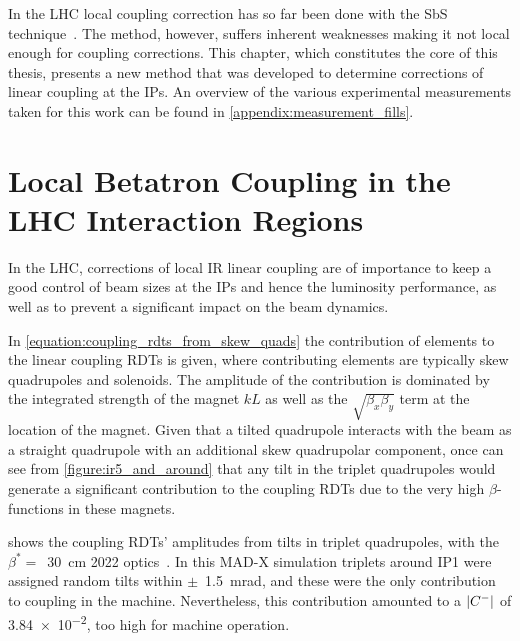 In the LHC local coupling correction has so far been done with the SbS technique~\cite{PRAB:Tomas:CERN_LHC_OMC}.
The method, however, suffers inherent weaknesses making it not local enough for coupling corrections.
This chapter, which constitutes the core of this thesis, presents a new method that was developed to determine corrections of linear coupling at the IPs.
An overview of the various experimental measurements taken for this work can be found in \cref{appendix:measurement_fills}.


\section{Local Betatron Coupling in the LHC Interaction Regions}
\label{section:local_ir_coupling}

In the LHC, corrections of local IR linear coupling are of importance to keep a good control of beam sizes at the IPs and hence the luminosity performance, as well as to prevent a significant impact on the beam dynamics.

In \cref{equation:coupling_rdts_from_skew_quads} the contribution of elements to the linear coupling RDTs is given, where contributing elements are typically skew quadrupoles and solenoids.
The amplitude of the contribution is dominated by the integrated strength of the magnet \(k L\) as well as the \(\sqrt{\beta_x \beta_y}\) term at the location of the magnet.
Given that a tilted quadrupole interacts with the beam as a straight quadrupole with an additional skew quadrupolar component, once can see from \cref{figure:ir5_and_around} that any tilt in the triplet quadrupoles would generate a significant contribution to the coupling RDTs due to the very high \(\beta\)-functions in these magnets.

 shows the coupling RDTs' amplitudes from tilts in triplet quadrupoles, with the \(\beta^{\ast} =\)~\qty{30}{\centi\meter} \num{2022} optics~\cite{CODE:acc-models-lhc}.
In this MAD-X simulation triplets around IP\num{1} were assigned random tilts within \(\pm\)~\qty{1.5}{\milli\radian}, and these were the only contribution to coupling in the machine.
Nevertheless, this contribution amounted to a \(\left\lvert C^{-} \right\rvert\) of \num{3.84e-2}, too high for machine operation.

